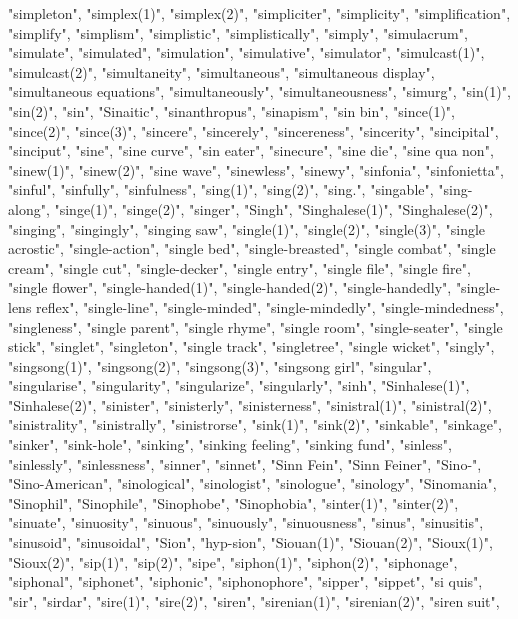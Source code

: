 "simpleton",
"simplex(1)",
"simplex(2)",
"simpliciter",
"simplicity",
"simplification",
"simplify",
"simplism",
"simplistic",
"simplistically",
"simply",
"simulacrum",
"simulate",
"simulated",
"simulation",
"simulative",
"simulator",
"simulcast(1)",
"simulcast(2)",
"simultaneity",
"simultaneous",
"simultaneous display",
"simultaneous equations",
"simultaneously",
"simultaneousness",
"simurg",
"sin(1)",
"sin(2)",
"sin",
"Sinaitic",
"sinanthropus",
"sinapism",
"sin bin",
"since(1)",
"since(2)",
"since(3)",
"sincere",
"sincerely",
"sincereness",
"sincerity",
"sincipital",
"sinciput",
"sine",
"sine curve",
"sin eater",
"sinecure",
"sine die",
"sine qua non",
"sinew(1)",
"sinew(2)",
"sine wave",
"sinewless",
"sinewy",
"sinfonia",
"sinfonietta",
"sinful",
"sinfully",
"sinfulness",
"sing(1)",
"sing(2)",
"sing.",
"singable",
"sing-along",
"singe(1)",
"singe(2)",
"singer",
"Singh",
"Singhalese(1)",
"Singhalese(2)",
"singing",
"singingly",
"singing saw",
"single(1)",
"single(2)",
"single(3)",
"single acrostic",
"single-action",
"single bed",
"single-breasted",
"single combat",
"single cream",
"single cut",
"single-decker",
"single entry",
"single file",
"single fire",
"single flower",
"single-handed(1)",
"single-handed(2)",
"single-handedly",
"single-lens reflex",
"single-line",
"single-minded",
"single-mindedly",
"single-mindedness",
"singleness",
"single parent",
"single rhyme",
"single room",
"single-seater",
"single stick",
"singlet",
"singleton",
"single track",
"singletree",
"single wicket",
"singly",
"singsong(1)",
"singsong(2)",
"singsong(3)",
"singsong girl",
"singular",
"singularise",
"singularity",
"singularize",
"singularly",
"sinh",
"Sinhalese(1)",
"Sinhalese(2)",
"sinister",
"sinisterly",
"sinisterness",
"sinistral(1)",
"sinistral(2)",
"sinistrality",
"sinistrally",
"sinistrorse",
"sink(1)",
"sink(2)",
"sinkable",
"sinkage",
"sinker",
"sink-hole",
"sinking",
"sinking feeling",
"sinking fund",
"sinless",
"sinlessly",
"sinlessness",
"sinner",
"sinnet",
"Sinn Fein",
"Sinn Feiner",
"Sino-",
"Sino-American",
"sinological",
"sinologist",
"sinologue",
"sinology",
"Sinomania",
"Sinophil",
"Sinophile",
"Sinophobe",
"Sinophobia",
"sinter(1)",
"sinter(2)",
"sinuate",
"sinuosity",
"sinuous",
"sinuously",
"sinuousness",
"sinus",
"sinusitis",
"sinusoid",
"sinusoidal",
"Sion",
"hyp-sion",
"Siouan(1)",
"Siouan(2)",
"Sioux(1)",
"Sioux(2)",
"sip(1)",
"sip(2)",
"sipe",
"siphon(1)",
"siphon(2)",
"siphonage",
"siphonal",
"siphonet",
"siphonic",
"siphonophore",
"sipper",
"sippet",
"si quis",
"sir",
"sirdar",
"sire(1)",
"sire(2)",
"siren",
"sirenian(1)",
"sirenian(2)",
"siren suit",
